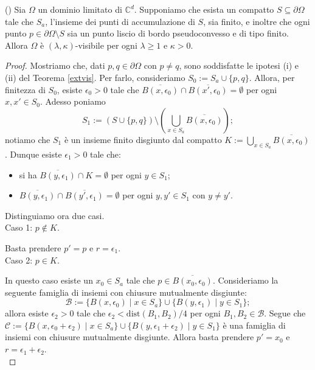 \begin{cor} \label{safinisvis}
    (\cite[Corollary 1.10]{CMS}) Sia $\Omega$ un dominio limitato di $\mathbb{C}^d$. Supponiamo che esista un compatto $S\subseteq\partial\Omega$ tale che $S_a$, l'insieme dei punti di accumulazione di $S$, sia finito, e inoltre che ogni punto $p\in\partial\Omega\setminus S$ sia un punto liscio di bordo pseudoconvesso e di tipo finito. Allora $\Omega$ è $(\lambda,\kappa)$-visibile per ogni $\lambda \ge 1$ e $\kappa>0$.
\end{cor}

\begin{proof}
    Mostriamo che, dati $p,q\in\partial\Omega$ con $p\not=q$, sono soddisfatte le ipotesi (i) e (ii) del Teorema \ref{extvis}. Per farlo, consideriamo $S_0:=S_a\cup\{p,q\}$. Allora, per finitezza di $S_0$, esiste $\epsilon_0>0$ tale che $\overline{B(x,\epsilon_0)}\cap\overline{B(x',\epsilon_0)}=\emptyset$ per ogni $x,x'\in S_0$. Adesso poniamo
    $$S_1:=(S\cup\{p,q\})\setminus\left(\bigcup_{x\in S_a}\overline{B(x,\epsilon_0)}\right);$$
    notiamo che $S_1$ è un insieme finito disgiunto dal compatto $K:=\displaystyle\bigcup_{x\in S_a}\overline{B(x,\epsilon_0)}$. Dunque esiste $\epsilon_1>0$ tale che:
    \begin{itemize}
        \item si ha $\overline{B(y,\epsilon_1)}\cap K=\emptyset$ per ogni $y\in S_1$;
        \item $\overline{B(y,\epsilon_1)}\cap\overline{B(y',\epsilon_1)}=\emptyset$ per ogni $y,y'\in S_1$ con $y\not=y'$.
    \end{itemize}
    
    Distinguiamo ora due casi. \\

    Caso 1: $p\not\in K$.

    Basta prendere $p'=p$ e $r=\epsilon_1$. \\

    Caso 2: $p\in K$.

    In questo caso esiste un $x_0\in S_a$ tale che $p\in\overline{B(x_0,\epsilon_0)}$. Consideriamo la seguente famiglia di insiemi con chiusure mutualmente disgiunte:
    $$\mathcal{B}:=\{B(x,\epsilon_0)\mid x\in S_a\}\cup\{B(y,\epsilon_1)\mid y\in S_1\};$$
    allora esiste $\epsilon_2>0$ tale che $\epsilon_2<\text{dist}(B_1,B_2)/4$ per ogni $B_1,B_2\in\mathcal{B}$. Segue che $\mathcal{C}:=\{B(x,\epsilon_0+\epsilon_2)\mid x\in S_a\}\cup\{B(y,\epsilon_1+\epsilon_2)\mid y\in S_1\}$ è una famiglia di insiemi con chiusure mutualmente disgiunte. Allora basta prendere $p'=x_0$ e $r=\epsilon_1+\epsilon_2$. \\


\end{proof}
